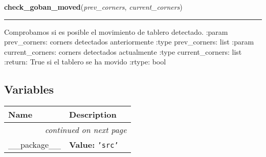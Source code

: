 \hspace{.8\funcindent}\begin{boxedminipage}{\funcwidth}

    \raggedright \textbf{check\_goban\_moved}(\textit{prev\_corners}, \textit{current\_corners})

    \vspace{-1.5ex}

    \rule{\textwidth}{0.5\fboxrule}
\setlength{\parskip}{2ex}
    Comprobamos si es posible el movimiento de tablero detectado. :param 
    prev\_corners: corners detectados anteriormente :type prev\_corners: 
    list :param current\_corners: corners detectados actualmente :type 
    current\_corners: list :return: True si el tablero se ha movido :rtype:
    bool

\setlength{\parskip}{1ex}
    \end{boxedminipage}



  \subsection{Variables}

    \vspace{-1cm}
\hspace{\varindent}\begin{longtable}{|p{\varnamewidth}|p{\vardescrwidth}|l}
\cline{1-2}
\cline{1-2} \centering \textbf{Name} & \centering \textbf{Description}& \\
\cline{1-2}
\endhead\cline{1-2}\multicolumn{3}{r}{\small\textit{continued on next page}}\\\endfoot\cline{1-2}
\endlastfoot\raggedright \_\-\_\-p\-a\-c\-k\-a\-g\-e\-\_\-\_\- & \raggedright \textbf{Value:} 
{\tt \texttt{'}\texttt{src}\texttt{'}}&\\
\cline{1-2}
\end{longtable}

